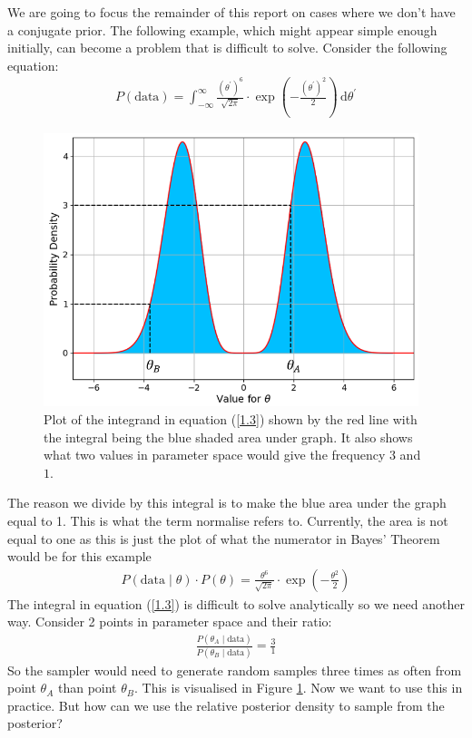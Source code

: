 \documentclass[12pt,twoside]{report}   %
\newcommand{\bkt}[1]{\left( #1 \right)}
\newcommand{\p}{\prime}
\begin{document}
We are going to focus the remainder of this report on cases where we don't have a conjugate prior. The following example, which might appear simple enough initially, can become a problem that is difficult to solve. Consider the following equation:
\begin{align}
P(\text{data}) = \int_{-\infty}^\infty\frac{\bkt{\theta^\p}^6}{\sqrt{2\pi}}\cdot\exp\left(-\frac{\bkt{\theta^\p}^2}{2}\right)\,\mathrm{d}\theta^\p\label{1.3}
\end{align}
\begin{figure}[H]
\centering
\includegraphics[width = 4.3in]{NormalDistribution.png}
\caption{Plot of the integrand in equation (\ref{1.3}) shown by the red line with the integral being the blue shaded area under graph. It also shows what two values in parameter space would give the frequency $3$ and $1$.}
\label{fig1.1}
\end{figure}
The reason we divide by this integral is to make the blue area under the graph equal to 1. This is what the term normalise refers to. Currently, the area is not equal to one as this is just the plot of what the numerator in Bayes' Theorem would be for this example
\begin{align*}
P(\text{data}\mid\theta)\cdot P(\theta) = \frac{\theta^6}{\sqrt{2\pi}}\cdot\exp\left(-\frac{\theta^2}{2}\right)
\end{align*}
The integral in equation (\ref{1.3}) is difficult to solve analytically so we need another way. Consider 2 points in parameter space and their ratio:
\begin{align*}
\frac{P(\theta_A\mid \text{data})}{P(\theta_B\mid \text{data})} = \frac{3}{1}
\end{align*}
So the sampler would need to generate random samples three times as often from point $\theta_A$ than point $\theta_B$. This is visualised in Figure \ref{fig1.1}. Now we want to use this in practice. But how can we use the relative posterior density to sample from the posterior?
\end{document}
